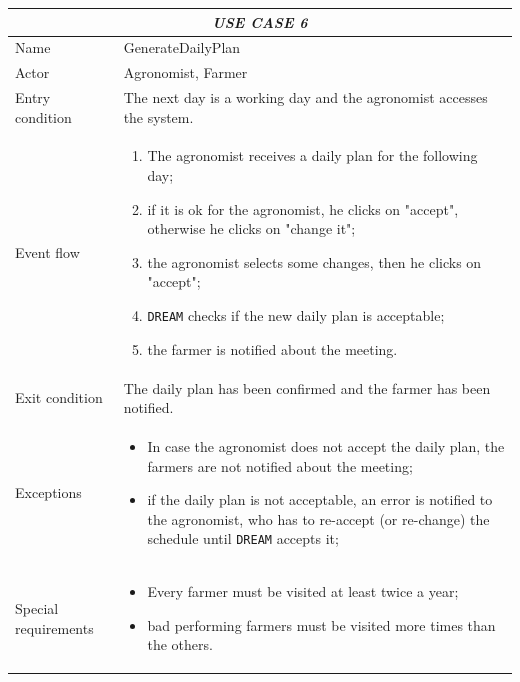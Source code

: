 \documentclass{article}
\begin{document}
\centering
\begin{longtable}{|p{3.5cm}|m{8cm}|}
 \hline
 \multicolumn{2}{|c|}{\cellcolor{white}\emph{USE CASE 6}} \\
 \endfirsthead
 \endhead
 \endfoot
 \endlastfoot
 \hline
 Name & GenerateDailyPlan\\
 \hline
 Actor & Agronomist, Farmer\\
 \hline
 Entry condition & The next day is a working day and the agronomist accesses the system.\\
 \hline
 Event flow & \begin{enumerate}
    \item The agronomist receives a daily plan for the following day;
    \item if it is ok for the agronomist, he clicks on  "accept", otherwise he clicks on "change it";
    \item the agronomist selects some changes, then he clicks on "accept";
    \item \verb|DREAM| checks if the new daily plan is acceptable;
    \item the farmer is notified about the meeting.
 \end{enumerate}\\
 \hline
 Exit condition & The daily plan has been confirmed and the farmer has been notified.\\
 \hline
 Exceptions & \begin{itemize}
     \item In case the agronomist does not accept the daily plan, the farmers are not notified about the meeting;
     \item if the daily plan is not acceptable, an error is notified to the agronomist, who has to re-accept (or re-change) the schedule until \verb|DREAM| accepts it;
 \end{itemize}\\
 \hline
 Special requirements &\begin{itemize}
     \item Every farmer must be visited at least twice a year;
     \item bad performing farmers must be visited more times than the others.
 \end{itemize}\\
 \hline
\end{longtable}
\end{document}
